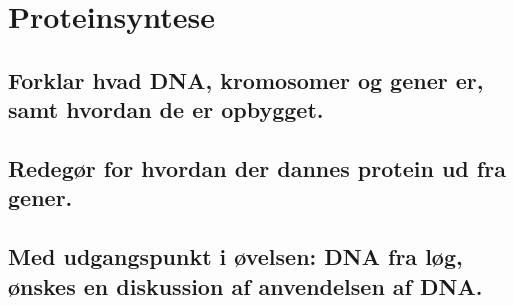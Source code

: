 \newpage
\section{Proteinsyntese}
\subsection{Forklar hvad DNA, kromosomer og gener er, samt hvordan de er opbygget.}
\subsection{Redegør for hvordan der dannes protein ud fra gener.}
\subsection{Med udgangspunkt i øvelsen: DNA fra løg, ønskes en diskussion af anvendelsen af DNA.}
